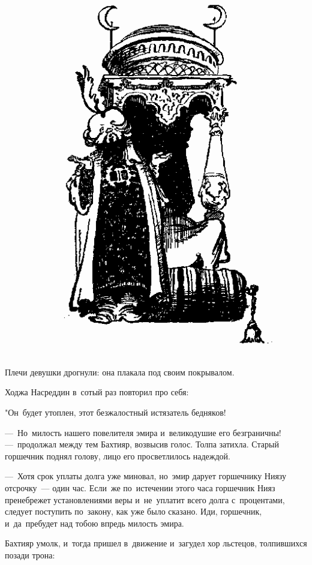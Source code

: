 \documentclass[12pt,a4paper]{book}
\begin{document}
\begin{figure}[h]
\centering
\includegraphics[scale=0.62]{8.png}
\end{figure}

Плечи девушки дрогнули: она плакала под своим покрывалом.

Ходжа Насреддин в~сотый раз повторил про себя:

"Он~будет утоплен, этот безжалостный истязатель бедняков!

—~Но~милость нашего повелителя эмира и~великодушие его безграничны! —~продолжал между тем Бахтияр, возвысив голос. Толпа затихла. Старый горшечник поднял голову, лицо его просветлилось надеждой.

—~Хотя срок уплаты долга уже миновал, но~эмир дарует горшечнику Ниязу отсрочку~— один час. Если~же по~истечении этого часа горшечник Нияз пренебрежет установлениями веры и~не~уплатит всего долга с~процентами, следует поступить по~закону, как уже было сказано. Иди, горшечник, и~да~пребудет над тобою впредь милость эмира.

Бахтияр умолк, и~тогда пришел в~движение и~загудел хор льстецов, толпившихся позади трона:
\end{document}
